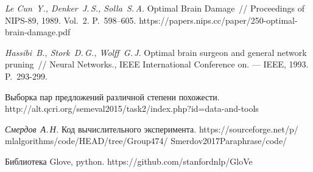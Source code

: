 \documentclass[12pt, fleqn, unicode]{article}
\begin{document}
\begin{thebibliography}{99}
	\textit{Le Cun~Y., Denker~J.\,S., Solla~S.\,A.} Optimal Brain Damage~// Proceedings of NIPS-89, 1989. Vol.~2. P.~598--605. {\ttfamily https://papers.nips.cc/paper/250-optimal-brain-damage.pdf}
	
	\textit{Hassibi~B., Stork~D.\,G., Wolff~G.\,J}. Optimal brain surgeon and general network pruning~// Neural Networks., IEEE International Conference on. --- IEEE, 1993. P.~293-299.
	
	Выборка пар предложений различной степени похожести. {\ttfamily  http://alt.qcri.org/semeval2015/task2/index.php?id=data-and-tools}
	
	
	\textit{Смердов~А.\,Н.} Код вычислительного эксперимента. {\ttfamily 
		https://sourceforge.net/p/
		mlalgorithms/code/HEAD/tree/Group474/
		Smerdov2017Paraphrase/code/}
	
	Библиотека Glove, python.
	{\ttfamily https://github.com/stanfordnlp/GloVe}

\end{thebibliography}
\end{document}
